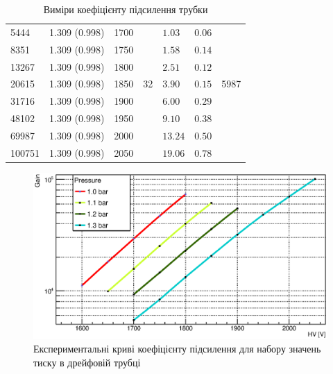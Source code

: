 \documentclass[pdftex,14pt]{scrartcl}
\begin{document}
\begin{spacing}{1.5}
\begin{table}[!h]
\begin{tabular}{|l|l|l|l|l|l|l|}
		& & & & & & \\
		\hline
		
		5444 & 1.309 (0.998) & 1700 &  & $1.03 $ & $ 0.06 $ & \\
		\hline
		8351 & 1.309 (0.998) & 1750 &  & $1.58 $ & $ 0.14$ & \\
		\hline
		13267 & 1.309 (0.998) & 1800 &  & $2.51 $ & $ 0.12 $ & \\
		\hline
		20615 & 1.309 (0.998) & 1850 & 32 & $3.90 $ & $ 0.15 $ & 5987 \\
		\hline
		31716 & 1.309 (0.998) & 1900 &  & $6.00 $ & $ 0.29 $ & \\
		\hline
		48102 & 1.309 (0.998) & 1950 &  & $9.10 $ & $ 0.38 $ & \\
		\hline
		69987 & 1.309 (0.998) & 2000 &  & $13.24 $ & $ 0.50 $ & \\
		\hline
		100751 & 1.309 (0.998) & 2050 &  & $19.06 $ & $ 0.78 $ & \\
		\hline
		
	\end{tabular}
	\caption{Виміри коефіцієнту підсилення трубки}
	\label{table:GainTotal}
	\end{table}
	
	\begin{figure}[!h]
	\centering
	\includegraphics[width=1.0\textwidth]{gain_multyGraph}
	\caption{ Експериментальні криві коефіцієнту підсилення для набору значень тиску в дрейфовій трубці}
	\label{fig:Gain_multy}
	\end{figure}
		
	

\end{spacing}
\end{document}
